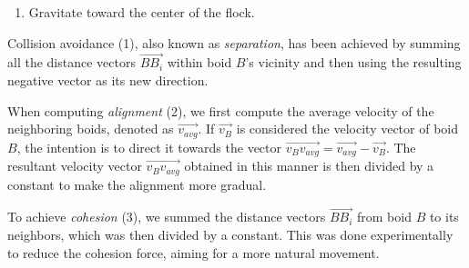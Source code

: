 \documentclass[9pt]{pnas-new}
\begin{document}
\begin{enumerate}
\begin{center}
	      \end{center}
	\item Gravitate toward the center of the flock.
	      \begin{center}
	      \end{center}
\end{enumerate}

Collision avoidance (1), also known as {\em separation}, has been achieved by summing all the distance vectors
$\overrightarrow{BB_i}$ within boid $B$'s vicinity and then using the resulting negative vector as its new direction.

When computing {\em alignment} (2), we first compute the average velocity of the
neighboring boids, denoted as $\overrightarrow{v_{avg}}$. If $\overrightarrow{v_B}$
is considered the velocity vector of boid $B$, the intention is to direct it towards
the vector $\overrightarrow{v_Bv_{avg}} = \overrightarrow{v_{avg}} - \overrightarrow{v_B}$.
The resultant velocity vector $\overrightarrow{v_Bv_{avg}}$ obtained in this manner is
then divided by a constant to make the alignment more gradual.

To achieve {\em cohesion} (3), we summed the distance vectors $\overrightarrow{BB_i}$
from boid $B$ to its neighbors, which was then divided by a constant. This was done
experimentally to reduce the cohesion force, aiming for a more natural movement.
\end{document}
